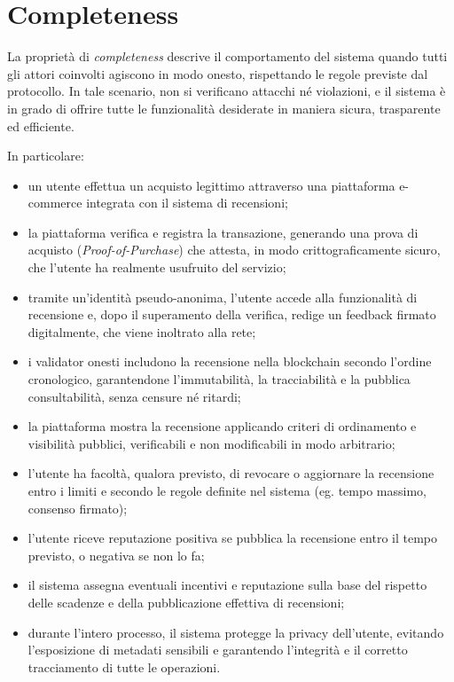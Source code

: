     \section{Completeness}
        La proprietà di \textit{completeness} descrive il comportamento del sistema quando tutti gli attori coinvolti agiscono in modo onesto, rispettando le regole previste dal protocollo. In tale scenario, non si verificano attacchi né violazioni, e il sistema è in grado di offrire tutte le funzionalità desiderate in maniera sicura, trasparente ed efficiente.
        
        \noindent In particolare:
        
        \begin{itemize}
            \item un utente effettua un acquisto legittimo attraverso una piattaforma e-commerce integrata con il sistema di recensioni;
            
            \item la piattaforma verifica e registra la transazione, generando una prova di acquisto (\textit{Proof-of-Purchase}) che attesta, in modo crittograficamente sicuro, che l'utente ha realmente usufruito del servizio;
            
            \item tramite un'identità pseudo-anonima, l'utente accede alla funzionalità di recensione e, dopo il superamento della verifica, redige un feedback firmato digitalmente, che viene inoltrato alla rete;
            
            \item i validator onesti includono la recensione nella blockchain secondo l'ordine cronologico, garantendone l'immutabilità, la tracciabilità e la pubblica consultabilità, senza censure né ritardi;
            
            \item la piattaforma mostra la recensione applicando criteri di ordinamento e visibilità pubblici, verificabili e non modificabili in modo arbitrario;
            
            \item l'utente ha facoltà, qualora previsto, di revocare o aggiornare la recensione entro i limiti e secondo le regole definite nel sistema (eg. tempo massimo, consenso firmato);
            
            \item l'utente riceve reputazione positiva se pubblica la recensione entro il tempo previsto, o negativa se non lo fa;
            
            \item il sistema assegna eventuali incentivi e reputazione sulla base del rispetto delle scadenze e della pubblicazione effettiva di recensioni;
            
            \item durante l'intero processo, il sistema protegge la privacy dell'utente, evitando l'esposizione di metadati sensibili e garantendo l'integrità e il corretto tracciamento di tutte le operazioni.
        \end{itemize}